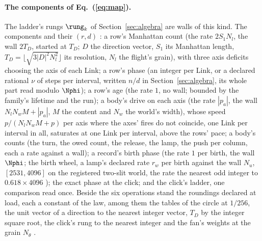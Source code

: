 \paragraph{The components of Eq.~(\ref{eq:map}).} The ladder's rungs $\rung_k$ of Section~\ref{sec:algebra} are walls of this kind. The components and their $(r, d)$ \cite{derivations}: a row's Manhattan count (the rate $2S_1N_l$,
the wall $2T_D$, started at $T_D$; $D$ the direction vector, $S_1$ its
Manhattan length, $T_D = \lfloor\sqrt{3|D|^2N_l^2}\rfloor$ its
resolution, $N_l$ the flight's grain), with three axis deficits choosing
the axis of each Link; a row's phase (an integer per Link, or a declared
rational $\nu$ of steps per interval, written $n/d$ in Section~\ref{sec:algebra}, its
whole part read modulo $\Nphi$); a row's age (the rate $1$, no wall; bounded by the family's lifetime and the run); a
body's drive on each axis (the rate $|p_a|$, the wall $N_l N_w M +
|p_a|$, $M$ the content and $N_w$ the world's width), whose speed $p/(N_l N_w M + p)$ per axis where the axes' fires do not coincide, one Link per interval in all, saturates at one Link per interval, above the rows' pace; a body's counts (the
turn, the owed count, the release, the lamp, the push per column, each a
rate against a wall); a record's birth phase (the rate $1$ per birth,
the wall $\Nphi$; the birth wheel, a lamp's declared rate $r_w$ per birth against the wall $N_u$, $[2531, 4096]$ on the registered two-slit world, the rate the nearest odd integer to $0.618 \times 4096$ \cite{beamlaw}); the exact phase at the click\cite{beamlaw}; and
the click's ladder, one comparison read once. Beside the six
operations stand the roundings declared at load, each a constant of the
law, among them the tables of the circle at $1/256$, the unit vector of
a direction to the nearest integer vector, $T_D$ by the integer square
root, the click's rung to the nearest integer and the fan's weights at
the grain $N_\theta$ \cite{lawvector}.

